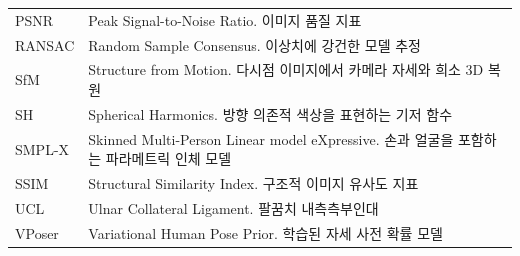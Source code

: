 \documentclass[11pt, a4paper]{report}
\begin{document}
\begin{longtable}{p{4cm}p{10cm}}
PSNR & Peak Signal-to-Noise Ratio. 이미지 품질 지표 \\
RANSAC & Random Sample Consensus. 이상치에 강건한 모델 추정 \\
SfM & Structure from Motion. 다시점 이미지에서 카메라 자세와 희소 3D 복원 \\
SH & Spherical Harmonics. 방향 의존적 색상을 표현하는 기저 함수 \\
SMPL-X & Skinned Multi-Person Linear model eXpressive. 손과 얼굴을 포함하는 파라메트릭 인체 모델 \\
SSIM & Structural Similarity Index. 구조적 이미지 유사도 지표 \\
UCL & Ulnar Collateral Ligament. 팔꿈치 내측측부인대 \\
VPoser & Variational Human Pose Prior. 학습된 자세 사전 확률 모델 \\
\bottomrule
\end{longtable}
\end{document}
